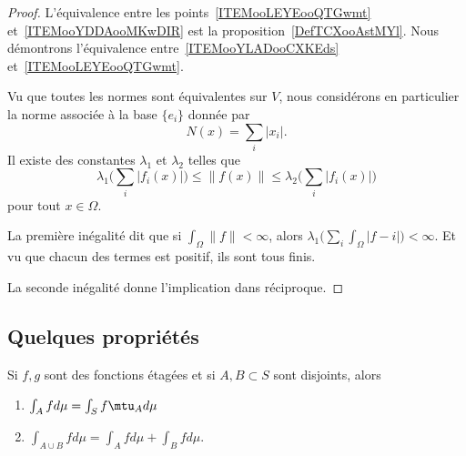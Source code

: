 \begin{proof}
    L'équivalence entre les points~\ref{ITEMooLEYEooQTGwmt} et~\ref{ITEMooYDDAooMKwDIR} est la proposition~\ref{DefTCXooAstMYl}. Nous démontrons l'équivalence entre~\ref{ITEMooYLADooCXKEds} et~\ref{ITEMooLEYEooQTGwmt}.

    Vu que toutes les normes sont équivalentes sur \( V\), nous considérons en particulier la norme associée à la base \( \{ e_i \}\) donnée par
    \begin{equation}
        N(x)=\sum_i| x_i |.
    \end{equation}
    Il existe des constantes \( \lambda_1\) et \( \lambda_2\) telles que
    \begin{equation}
        \lambda_1\big( \sum_i| f_i(x) | \big)\leq \| f(x) \|\leq \lambda_2\big( \sum_i| f_i(x) | \big)
    \end{equation}
    pour tout \( x\in \Omega\).

    La première inégalité dit que si \( \int_{\Omega}\| f \|<\infty\), alors \( \lambda_1\big( \sum_i\int_{\Omega}| f-i | \big)<\infty\). Et vu que chacun des termes est positif, ils sont tous finis.

    La seconde inégalité donne l'implication dans réciproque.
\end{proof}

\subsection{Quelques propriétés}

\begin{proposition}     \label{PROPooFLZVooQoDsAn}
    Si \( f,g\) sont des fonctions étagées et si \( A,B\subset S\) sont disjoints, alors
    \begin{enumerate}
        \item
            \( \int_Afd\mu=\int_Sf\mtu_Ad\mu\)
        \item       \label{ITEMooHZQKooSUKlFk}
            \( \int_{A\cup B}fd\mu=\int_Afd\mu+\int_Bfd\mu\).
    \end{enumerate}
\end{proposition}

